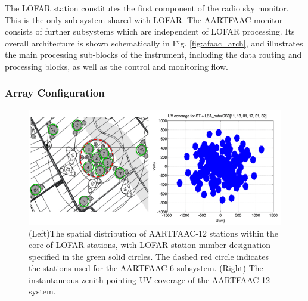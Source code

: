 \documentclass{ws-jai}
\begin{document}
The LOFAR station constitutes the first component of the radio sky monitor. This
is the  only sub-system  shared with  LOFAR.  The  AARTFAAC monitor  consists of
further  subsystems which  are  independent of  LOFAR  processing.  Its  overall
architecture   is  shown   schematically  in   Fig.  \ref{fig:afaac_arch},   and
illustrates the main processing sub-blocks of the instrument, including the data
routing and processing blocks, as well as the control and monitoring flow.


\subsubsection {Array Configuration}

\begin{figure}[htbp]
\includegraphics[width=\textwidth]{Figs/A12_config_uvcov/Slide1.png}
\caption{(Left)The spatial distribution of  AARTFAAC-12 stations within the core
  of  LOFAR stations,  with LOFAR  station number  designation specified  in the
  green solid circles. The dashed red circle indicates the stations used for the
  AARTFAAC-6 subsystem. (Right) The instantaneous zenith pointing UV coverage of
  the AARTFAAC-12 system.}
\label{fig:afaac12_arrayconfig}
\end{figure}
\end{document}
